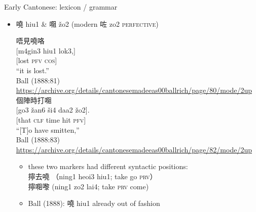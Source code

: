 \documentclass{beamer}
\begin{document}
\begin{frame}[fragile]{Early Cantonese: lexicon / grammar}

\begin{itemize}
    \item 嘵 hiu1 \& 唨 žo2 (modern 咗 zo2 \textsc{perfective})\\
    \smallskip
    {\footnotesize 唔見嘵咯\\
    {[m4gin3 hiu1 lok3,]}\\
    {[lost \textsc{pfv} \textsc{cos}]}\\
    \enquote{it is lost.}\\
    {\tiny Ball (1888:81) \url{https://archive.org/details/cantonesemadeeas00ballrich/page/80/mode/2up}}\\
    個陣時打唨\\
    {[go3 žan6 ši4 daa2 žo2].}\\
    {[that \textsc{clf} time hit \textsc{pfv}]}\\
    \enquote{[T]o have smitten,}\\
    {\tiny Ball (1888:83) \url{https://archive.org/details/cantonesemadeeas00ballrich/page/82/mode/2up}}\\
    \medskip
        \begin{itemize}
            \item these two markers had different syntactic positions:\\ 擰去嘵 （ning1 heoi3 hiu1; take go \textsc{prv}）\\
            擰唨嚟 (ning1 zo2 lai4; take \textsc{prv} come)\\
            \item Ball (1888): 嘵 hiu1 already out of fashion\\
        \end{itemize}
    
    }
\end{itemize}

\end{frame}
\end{document}
